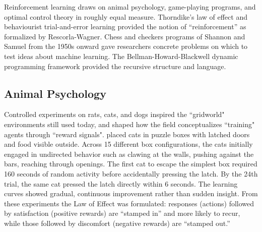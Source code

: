 
Reinforcement learning draws on animal psychology, game-playing programs, and optimal control theory in roughly equal measure. Thorndike's law of effect and behaviourist trial-and-error learning provided the notion of ``reinforcement'' as formalized by Rescorla-Wagner.  Chess and checkers programs of Shannon and Samuel from the 1950s onward gave researchers concrete problems on which to test ideas about machine learning. The Bellman-Howard-Blackwell dynamic programming framework provided the recursive structure and language. 

\subsection{Animal Psychology}
\label{sec:animal_psychology}

Controlled experiments on rats, cats, and dogs inspired the ``gridworld" environments still used today, and shaped how the field conceptualizes ``training" agents through ``reward signals". \citet{Thorndike1898} placed cats in puzzle boxes with latched doors and food visible outside. Across 15 different box configurations, the cats initially engaged in undirected behavior such as clawing at the walls, pushing against the bars, reaching through openings. The first cat to escape the simplest box required 160 seconds of random activity before accidentally pressing the latch. By the 24th trial, the same cat pressed the latch directly within 6 seconds. The learning curves showed gradual, continuous improvement rather than sudden insight. From these experiments the Law of Effect was formulated: responses (actions) followed by satisfaction (positive rewards) are ``stamped in'' and more likely to recur, while those followed by discomfort (negative rewards) are ``stamped out.''


